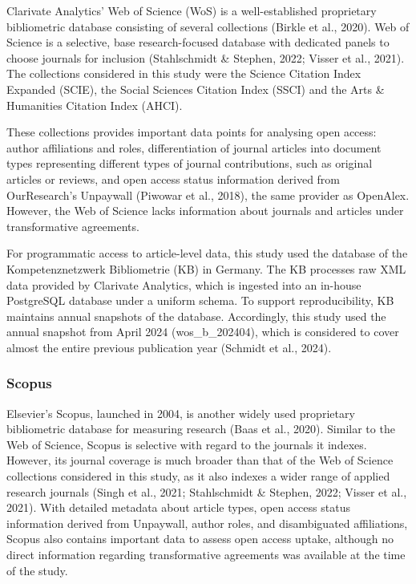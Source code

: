 \documentclass[a4paper,man,floatsintext,longtable,noextraspace,10pt]{apa6}
\begin{document}
Clarivate Analytics' Web of Science (WoS) is a well-established
proprietary bibliometric database consisting of several collections
(Birkle et al., 2020). Web of Science is a selective, base
research-focused database with dedicated panels to choose journals for
inclusion (Stahlschmidt \& Stephen, 2022; Visser et al., 2021). The
collections considered in this study were the Science Citation Index
Expanded (SCIE), the Social Sciences Citation Index (SSCI) and the Arts
\& Humanities Citation Index (AHCI).

These collections provides important data points for analysing open
access: author affiliations and roles, differentiation of journal
articles into document types representing different types of journal
contributions, such as original articles or reviews, and open access
status information derived from OurResearch's Unpaywall (Piwowar et al.,
2018), the same provider as OpenAlex. However, the Web of Science lacks
information about journals and articles under transformative agreements.

For programmatic access to article-level data, this study used the
database of the Kompetenznetzwerk Bibliometrie (KB) in Germany. The KB
processes raw XML data provided by Clarivate Analytics, which is
ingested into an in-house PostgreSQL database under a uniform schema. To
support reproducibility, KB maintains annual snapshots of the database.
Accordingly, this study used the annual snapshot from April 2024
(wos\_b\_202404), which is considered to cover almost the entire
previous publication year (Schmidt et al., 2024).

\subsubsection{Scopus}\label{scopus}

Elsevier's Scopus, launched in 2004, is another widely used proprietary
bibliometric database for measuring research (Baas et al., 2020).
Similar to the Web of Science, Scopus is selective with regard to the
journals it indexes. However, its journal coverage is much broader than
that of the Web of Science collections considered in this study, as it
also indexes a wider range of applied research journals (Singh et al.,
2021; Stahlschmidt \& Stephen, 2022; Visser et al., 2021). With detailed
metadata about article types, open access status information derived
from Unpaywall, author roles, and disambiguated affiliations, Scopus
also contains important data to assess open access uptake, although no
direct information regarding transformative agreements was available at
the time of the study.
\end{document}
